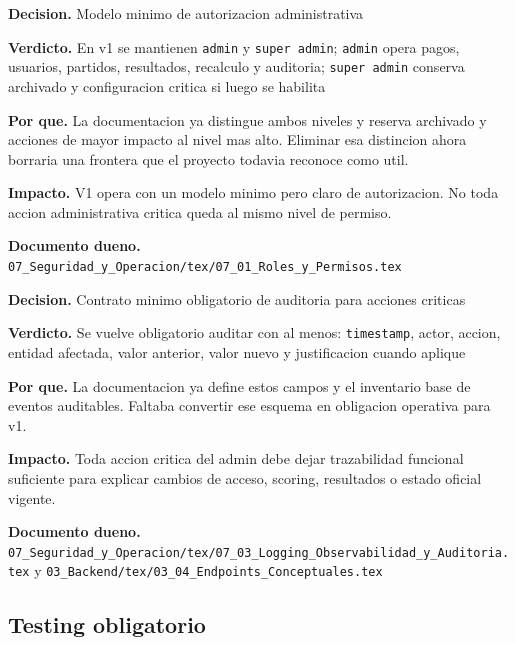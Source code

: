 \begin{docnote}
\textbf{Decision.} Modelo minimo de autorizacion administrativa

\textbf{Verdicto.} En v1 se mantienen \texttt{admin} y \texttt{super admin}; \texttt{admin} opera pagos, usuarios, partidos, resultados, recalculo y auditoria; \texttt{super admin} conserva archivado y configuracion critica si luego se habilita

\textbf{Por que.} La documentacion ya distingue ambos niveles y reserva archivado y acciones de mayor impacto al nivel mas alto. Eliminar esa distincion ahora borraria una frontera que el proyecto todavia reconoce como util.

\textbf{Impacto.} V1 opera con un modelo minimo pero claro de autorizacion. No toda accion administrativa critica queda al mismo nivel de permiso.

\textbf{Documento dueno.} \texttt{07\_Seguridad\_y\_Operacion/tex/07\_01\_Roles\_y\_Permisos.tex}
\end{docnote}

\begin{docnote}
\textbf{Decision.} Contrato minimo obligatorio de auditoria para acciones criticas

\textbf{Verdicto.} Se vuelve obligatorio auditar con al menos: \texttt{timestamp}, actor, accion, entidad afectada, valor anterior, valor nuevo y justificacion cuando aplique

\textbf{Por que.} La documentacion ya define estos campos y el inventario base de eventos auditables. Faltaba convertir ese esquema en obligacion operativa para v1.

\textbf{Impacto.} Toda accion critica del admin debe dejar trazabilidad funcional suficiente para explicar cambios de acceso, scoring, resultados o estado oficial vigente.

\textbf{Documento dueno.} \texttt{07\_Seguridad\_y\_Operacion/tex/07\_03\_Logging\_Observabilidad\_y\_Auditoria.tex} y \texttt{03\_Backend/tex/03\_04\_Endpoints\_Conceptuales.tex}
\end{docnote}

\subsection{Testing obligatorio}

